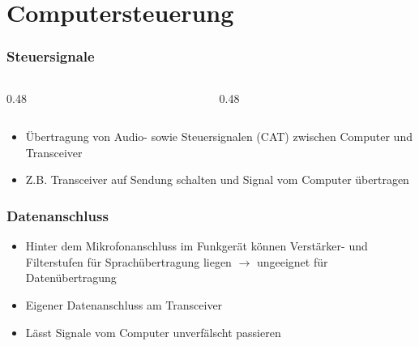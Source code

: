 \section{Computersteuerung}
\label{section:computersteuerung}
\begin{frame}%
    \frametitle{Steuersignale}
    \begin{columns}
        \begin{column}{0.48\textwidth}
        \end{column}
        \begin{column}{0.48\textwidth}
        \end{column}
    \end{columns}

    \vspace{20pt}
    \begin{itemize}
        \item Übertragung von Audio- sowie Steuersignalen (CAT) zwischen Computer und Transceiver
        \item Z.B. Transceiver auf Sendung schalten und Signal vom Computer übertragen
    \end{itemize}
\end{frame}

\begin{frame}
    \frametitle{Datenanschluss}
    \begin{itemize}
        \item Hinter dem Mikrofonanschluss im Funkgerät können Verstärker- und Filterstufen für Sprachübertragung liegen $\rightarrow$ ungeeignet für Datenübertragung
        \item Eigener Datenanschluss am Transceiver
        \item Lässt Signale vom Computer unverfälscht passieren
    \end{itemize}

\end{frame}

